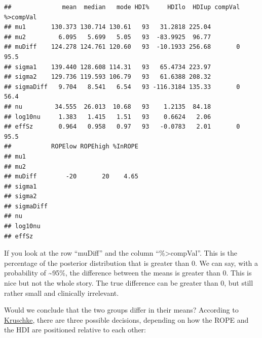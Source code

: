 \documentclass[
]{book}
\begin{document}
\begin{verbatim}
##              mean  median   mode HDI%     HDIlo  HDIup compVal %>compVal
## mu1       130.373 130.714 130.61   93   31.2818 225.04                  
## mu2         6.095   5.699   5.05   93  -83.9925  96.77                  
## muDiff    124.278 124.761 120.60   93  -10.1933 256.68       0      95.5
## sigma1    139.440 128.608 114.31   93   65.4734 223.97                  
## sigma2    129.736 119.593 106.79   93   61.6388 208.32                  
## sigmaDiff   9.704   8.541   6.54   93 -116.3184 135.33       0      56.4
## nu         34.555  26.013  10.68   93    1.2135  84.18                  
## log10nu     1.383   1.415   1.51   93    0.6624   2.06                  
## effSz       0.964   0.958   0.97   93   -0.0783   2.01       0      95.5
##           ROPElow ROPEhigh %InROPE
## mu1                               
## mu2                               
## muDiff        -20       20    4.65
## sigma1                            
## sigma2                            
## sigmaDiff                         
## nu                                
## log10nu                           
## effSz
\end{verbatim}

If you look at the row ``muDiff'' and the column ``\%\textgreater compVal''. This is the percentage
of the posterior distribution that is greater than 0. We can say, with a probability of
\textasciitilde95\%, the difference between the means is greater than 0. This is nice but not the whole story.
The true difference can be greater than 0, but still rather small and clinically irrelevant.

Would we conclude that the two groups differ in their means?
According to \href{https://nyu-cdsc.github.io/learningr/assets/kruschke_bayesian_in_R.pdf}{Kruschke}, there are three possible decisions, depending on how the ROPE and the HDI are positioned relative to each other:
\end{document}
